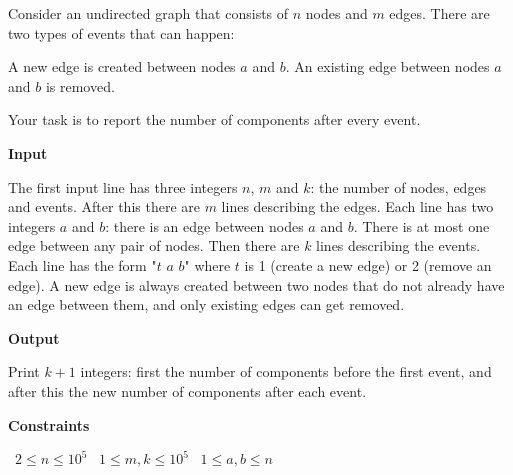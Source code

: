 Consider an undirected graph that consists of $n$ nodes and $m$ edges. There are two types of events that can happen:

A new edge is created between nodes $a$ and $b$.
An existing edge between nodes $a$ and $b$ is removed.

Your task is to report the number of components after every event.

\vspace{0.3cm}\noindent\textbf{Input}

The first input line has three integers $n$, $m$ and $k$: the number of nodes, edges and events.
After this there are $m$ lines describing the edges. Each line has two integers $a$ and $b$: there is an edge between nodes $a$ and $b$. There is at most one edge between any pair of nodes.
Then there are $k$ lines describing the events. Each line has the form "$t$ $a$ $b$" where $t$ is 1 (create a new edge) or 2 (remove an edge). A new edge is always created between two nodes that do not already have an edge between them, and only existing edges can get removed.

\vspace{0.3cm}\noindent\textbf{Output}

Print $k+1$ integers: first the number of components before the first event, and after this the new number of components after each event.

\vspace{0.3cm}\noindent\textbf{Constraints}

\textbullet\ $2 \le n \le 10^5$
\textbullet\ $1 \le m,k \le 10^5$
\textbullet\ $1 \le a,b \le n$